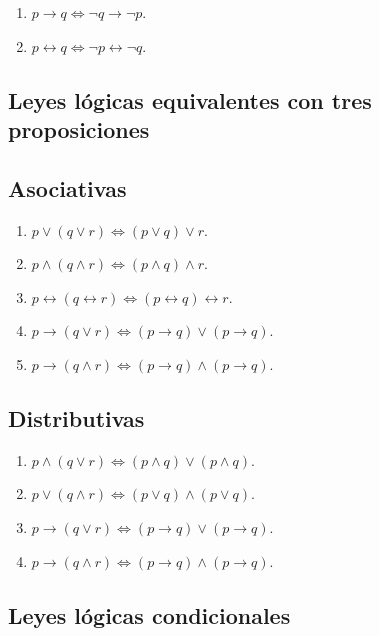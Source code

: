 \begin{enumerate}
 \item $p \rightarrow q \Leftrightarrow \neg q \rightarrow \neg p$.
 \item $p \leftrightarrow q \Leftrightarrow \neg p \leftrightarrow \neg q$.
\end{enumerate}

\subsection{Leyes lógicas equivalentes con tres proposiciones}

\subsection{Asociativas}

\begin{enumerate}
 \item $p \vee (q \vee r) \Leftrightarrow (p \vee q) \vee r$.
 \item $p \wedge (q \wedge r) \Leftrightarrow (p \wedge q) \wedge r$.
 \item $p \leftrightarrow (q \leftrightarrow r) \Leftrightarrow (p 
\leftrightarrow q) \leftrightarrow r$.
 \item $p \rightarrow (q \vee r) \Leftrightarrow (p \rightarrow q) \vee (p 
\rightarrow q)$.
 \item $p \rightarrow (q \wedge r) \Leftrightarrow (p \rightarrow q) \wedge (p 
\rightarrow q)$.
\end{enumerate}

\subsection{Distributivas}

\begin{enumerate}
\item $p \wedge (q \vee r) \Leftrightarrow (p \wedge q) \vee (p 
\wedge q)$.
\item $p \vee (q \wedge r) \Leftrightarrow (p \vee q) \wedge (p 
\vee q)$.
 \item $p \rightarrow (q \vee r) \Leftrightarrow (p \rightarrow q) \vee (p 
\rightarrow q)$.
 \item $p \rightarrow (q \wedge r) \Leftrightarrow (p \rightarrow q) \wedge (p 
\rightarrow q)$.
\end{enumerate}

\subsection{Leyes lógicas condicionales}

